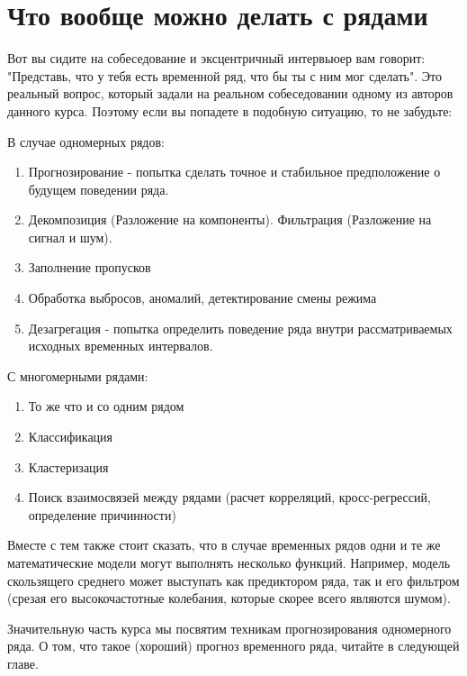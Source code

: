 \section{Что вообще можно делать с рядами}

Вот вы сидите на собеседование и эксцентричный интервьюер вам
говорит: "Представь, что у тебя есть временной ряд, что бы ты с ним
мог сделать". Это реальный вопрос, который задали на реальном
собеседовании одному из авторов данного курса. Поэтому если вы
попадете в подобную ситуацию, то не забудьте:

В случае одномерных рядов:

\begin{enumerate}
  \item Прогнозирование - попытка сделать точное и стабильное
    предположение о будущем поведении ряда.
  \item Декомпозиция (Разложение на компоненты). Фильтрация
    (Разложение на сигнал и шум).
  \item Заполнение пропусков
  \item Обработка выбросов, аномалий, детектирование смены режима
  \item Дезагрегация - попытка определить поведение ряда внутри
    рассматриваемых исходных временных интервалов.
\end{enumerate}

С многомерными рядами:

\begin{enumerate}
  \item То же что и со одним рядом
  \item Классификация
  \item Кластеризация
  \item Поиск взаимосвязей между рядами (расчет корреляций,
    кросс-регрессий, определение причинности)
\end{enumerate}

Вместе с тем также стоит сказать, что в случае временных рядов одни и
те же математические модели могут выполнять несколько функций.
Например, модель скользящего среднего может выступать как предиктором
ряда, так и его фильтром (срезая его высокочастотные колебания,
которые скорее всего являются шумом).

Значительную часть курса мы посвятим техникам прогнозирования
одномерного ряда. О том, что такое (хороший) прогноз временного ряда,
читайте в следующей главе.